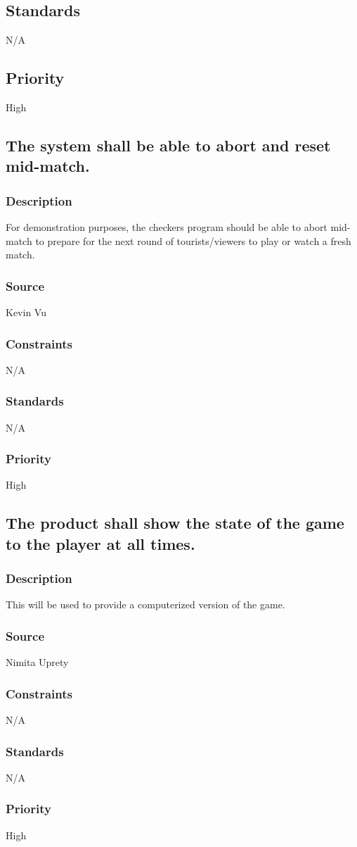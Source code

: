 \subsection{Standards}
N/A
\subsection{Priority}
High

\subsection{The system shall be able to abort and reset mid-match.}
\subsubsection{Description}
For demonstration purposes, the checkers program should be able to abort mid-match to prepare for the next round of tourists/viewers to play or watch a fresh match.
\subsubsection{Source}
Kevin Vu
\subsubsection{Constraints}
N/A
\subsubsection{Standards}
N/A
\subsubsection{Priority}
High

\subsection{The product shall show the state of the game to the player at all times.}
\subsubsection{Description}
This will be used to provide a computerized version of the game.
\subsubsection{Source}
Nimita Uprety
\subsubsection{Constraints}
N/A
\subsubsection{Standards}
N/A
\subsubsection{Priority}
High